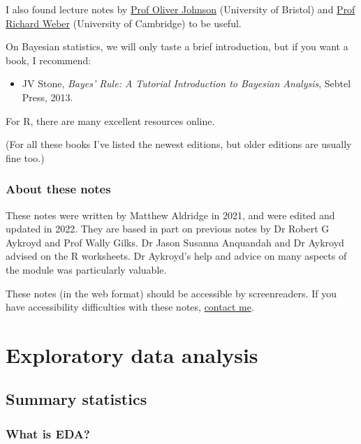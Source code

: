 \documentclass[
  letterpaper,
  DIV=11,
  numbers=noendperiod]{scrreprt}
\providecommand{\tightlist}{%
  \setlength{\itemsep}{0pt}\setlength{\parskip}{0pt}}\usepackage{longtable,booktabs,array}
\theoremstyle{remark}
\begin{document}
I also found lecture notes by
\href{https://people.maths.bris.ac.uk/~maotj/teaching.html}{Prof Oliver
Johnson} (University of Bristol) and
\href{http://www.statslab.cam.ac.uk/~rrw1/prob/index.html}{Prof Richard
Weber} (University of Cambridge) to be useful.

On Bayesian statistics, we will only taste a brief introduction, but if
you want a book, I recommend:

\begin{itemize}
\tightlist
\item
  JV Stone, \emph{Bayes' Rule: A Tutorial Introduction to Bayesian
  Analysis}, Sebtel Press, 2013.
\end{itemize}

For R, there are many excellent resources online.

(For all these books I've listed the newest editions, but older editions
are usually fine too.)

\hypertarget{about-notes}{%
\section*{About these notes}\label{about-notes}}


These notes were written by Matthew Aldridge in 2021, and were edited
and updated in 2022. They are based in part on previous notes by Dr
Robert G Aykroyd and Prof Wally Gilks. Dr Jason Susanna Anquandah and Dr
Aykroyd advised on the R worksheets. Dr Aykroyd's help and advice on
many aspects of the module was particularly valuable.

These notes (in the web format) should be accessible by screenreaders.
If you have accessibility difficulties with these notes,
\href{mailto:m.aldridge@leeds.ac.uk}{contact me}.

\part{Exploratory data analysis}

\hypertarget{L01-stats}{%
\chapter{Summary statistics}\label{L01-stats}}

\hypertarget{what-is-eda}{%
\section{What is EDA?}\label{what-is-eda}}
\end{document}
